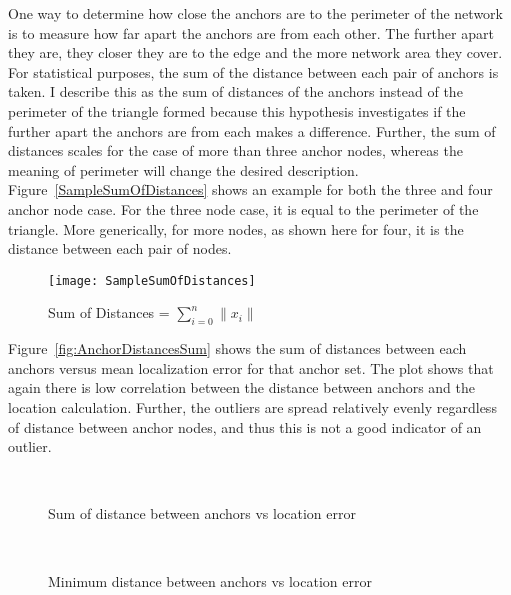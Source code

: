One way to determine how close the anchors are to the perimeter of the network is to measure how far apart the anchors are from each other.  The further apart they are, they closer they are to the edge and the more network area they cover.  For statistical purposes, the sum of the distance between each pair of anchors is taken.  I describe this as the sum of distances of the anchors instead of the perimeter of the triangle formed because this hypothesis investigates if the further apart the anchors are from each makes a difference. Further, the sum of distances scales for the case of more than three anchor nodes, whereas the meaning of perimeter will change the desired description.  Figure~\ref{SampleSumOfDistances} shows an example for both the three and four anchor node case.  For the three node case, it is equal to the perimeter of the triangle.  More generically, for more nodes, as shown here for four, it is the distance between each pair of nodes.

\begin{figure}
  \centering
    \texttt{[image: SampleSumOfDistances]}
    \caption{Sum of Distances = $\sum_{i=0}^{n} \|x_{i}\| $}
	\label{fig:SampleSumOfDistances}
\end{figure}

Figure~\ref{fig:AnchorDistancesSum} shows the sum of distances between each anchors versus mean localization error for that anchor set. The plot shows that again there is low correlation between the distance between anchors and the location calculation.  Further, the outliers are spread relatively evenly regardless of distance between anchor nodes, and thus this is not a good indicator of an outlier.

\begin{figure}
  \centering
\\
	\caption{Sum of distance between anchors vs location error}
    \label{fig:SumAnchorDistances}
\end{figure}
\begin{figure}
  \centering
\\
	\caption{Minimum distance between anchors vs location error}
    \label{fig:MinAnchorDistances}
\end{figure}

